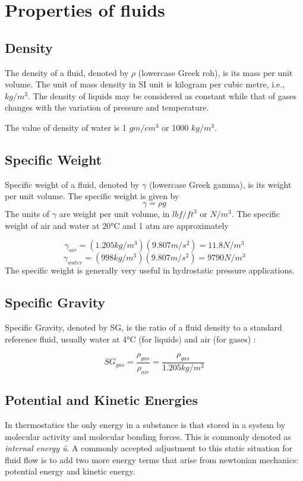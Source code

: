 \documentclass[12pt,twoside]{report}
\begin{document}
\section{Properties of fluids}
\subsection{Density}
The density of a fluid, denoted by $\rho$ (lowercase Greek roh), is its mass per unit volume. The unit of mass density in SI unit is kilogram per cubic metre, i.e., $kg/m^{3}$. The density of liquids may be considered as constant while that of gases changes with the variation of pressure and temperature.\par
	
The value of density of water is 1 $gm/cm^{3}$ or 1000 $kg/m^{3}$. \cite{White}
	
\subsection{Specific Weight}
Specific weight of a fluid, denoted by $\gamma$ (lowercase Greek gamma), is its weight per unit volume. The specific weight is given by
\begin{equation}
		\gamma = \rho\textit{g} \label{eq:2.3}
\end{equation}
The units of $\gamma$ are weight per unit volume, in $lbf/ft^3$ or $N/m^3$. The specific weight of air and water at 20°C and 1 atm are approximately \newline
	
	\[\gamma_{air} = (1.205 kg/m^3)(9.807 m/s^2) = 11.8 N/m^3 \]
	\[ \gamma_{water} = (998 kg/m^3)(9.807m/s^2) = 9790 N/m^3\]
	The specific weight is generally very useful in hydrostatic pressure applications. \cite{White}
\subsection{Specific Gravity}
Specific Gravity, denoted by SG, is the ratio of a fluid density to a standard reference fluid, usually water at 4°C (for liquids) and air (for gases) \cite{White}:
	
	
\begin{equation} \label{eq:2.4}
SG_{gas} = \frac{\rho_{gas}}{\rho_{air}}  = \frac{\rho_{gas}}{1.205 kg/m^3}
\end{equation}

\subsection{Potential and Kinetic Energies}
In thermostatics the only energy in a substance is that stored in a system by molecular
activity and molecular bonding forces. This is commonly denoted as \textit{internal energy \^{u}}. A commonly accepted adjustment to this static situation for fluid flow is to
add two more energy terms that arise from newtonian mechanics: potential energy
and kinetic energy. \par 
\end{document}
